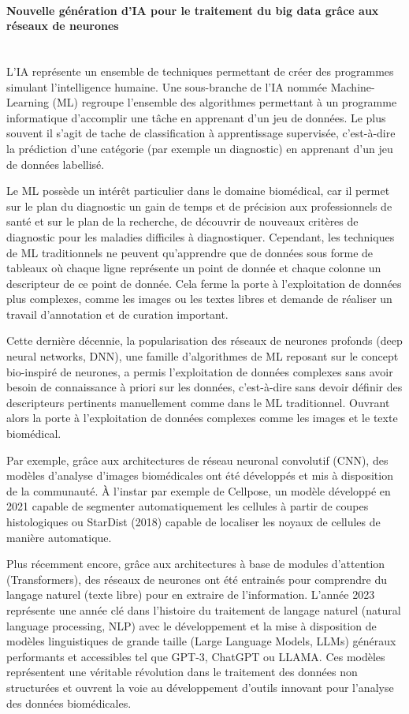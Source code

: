 \paragraph{\textbf{Nouvelle génération d’IA pour le traitement du big data grâce aux réseaux de neurones}}\mbox{}\\

L’IA représente un ensemble de techniques permettant de créer des programmes simulant l’intelligence humaine. Une sous-branche de l’IA nommée Machine-Learning (ML) regroupe l’ensemble des algorithmes permettant à un programme informatique d’accomplir une tâche en apprenant d’un jeu de données. Le plus souvent il s’agit de tache de classification à apprentissage supervisée, c’est-à-dire la prédiction d’une catégorie (par exemple un diagnostic) en apprenant d’un jeu de données labellisé.

Le ML possède un intérêt particulier dans le domaine biomédical, car il permet sur le plan du diagnostic un gain de temps et de précision aux professionnels de santé et sur le plan de la recherche, de découvrir de nouveaux critères de diagnostic pour les maladies difficiles à diagnostiquer. Cependant, les techniques de ML traditionnels ne peuvent qu’apprendre que de données sous forme de tableaux où chaque ligne représente un point de donnée et chaque colonne un descripteur de ce point de donnée. Cela ferme la porte à l’exploitation de données plus complexes, comme les images ou les textes libres et demande de réaliser un travail d’annotation et de curation important.

Cette dernière décennie, la popularisation des réseaux de neurones profonds (deep neural networks, DNN), une famille d’algorithmes de ML reposant sur le concept bio-inspiré de neurones, a permis l’exploitation de données complexes sans avoir besoin de connaissance à priori sur les données, c’est-à-dire sans devoir définir des descripteurs pertinents manuellement comme dans le ML traditionnel. Ouvrant alors la porte à l’exploitation de données complexes comme les images et le texte biomédical.

Par exemple, grâce aux architectures de réseau neuronal convolutif (CNN), des modèles d’analyse d’images biomédicales ont été développés et mis à disposition de la communauté. À l’instar par exemple de Cellpose, un modèle développé en 2021 capable de segmenter automatiquement les cellules à partir de coupes histologiques ou StarDist (2018) capable de localiser les noyaux de cellules de manière automatique.

Plus récemment encore, grâce aux architectures à base de modules d’attention (Transformers), des réseaux de neurones ont été entrainés pour comprendre du langage naturel (texte libre) pour en extraire de l’information. L’année 2023 représente une année clé dans l’histoire du traitement de langage naturel (natural language processing, NLP) avec le développement et la mise à disposition de modèles linguistiques de grande taille (Large Language Models, LLMs) généraux performants et accessibles tel que GPT-3, ChatGPT ou LLAMA. Ces modèles représentent une véritable révolution dans le traitement des données non structurées et ouvrent la voie au développement d’outils innovant pour l’analyse des données biomédicales.

